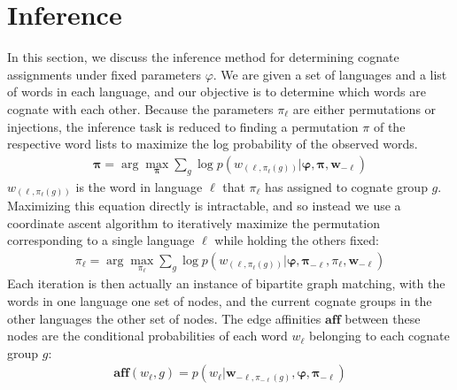 \documentclass[11pt,a4paper]{article}
\begin{document}
\section{Inference}
In this section, we discuss the inference method for determining
cognate assignments under fixed parameters $\varphi$.  We are given a
set of languages and a list of words in each language, and our
objective is to determine which words are cognate with each other.
Because the parameters $\pi_\ell$ are either permutations or injections,
the inference task is reduced to finding a permutation $\pi$ of the
respective word lists to maximize the log probability of the observed
words.
\begin{equation*}
  \begin{split}
    \mathbf{\pi} = \arg\!\max_{\mathbf \pi} \sum_{g} \log p(w_{(\ell,\pi_\ell(g))}|\mathbf \varphi,\mathbf \pi, \mathbf{w}_{-\ell})
   \end{split}
 \end{equation*}
$w_{(\ell,\pi_\ell(g))}$ is the word in language $\ell$ that
$\pi_\ell$ has assigned to cognate group $g$. Maximizing this equation
directly is intractable, and so instead we use a coordinate ascent
algorithm to iteratively maximize the permutation corresponding to
a single language $\ell$ while holding the others fixed:
\begin{equation*}
  \begin{split}
    \pi_\ell = \arg\!\max_{\pi_\ell} \sum_{g} \log p(w_{(\ell,\pi_\ell(g))}|\mathbf \varphi,\mathbf \pi_{-\ell},\pi_\ell, \mathbf{w}_{-\ell})
  \end{split}
\end{equation*}
Each iteration is then actually an instance of bipartite graph
matching, with the words in one language one set of nodes, and the
current cognate groups in the other languages the other set of
nodes. The edge affinities $\mathbf{aff}$ between these nodes are the conditional
probabilities of each word $w_\ell$ belonging to each cognate group $g$:
\begin{equation*}
  \begin{split}
    \mathbf{aff}(w_\ell,g) = p(w_\ell|\mathbf w_{-\ell,\pi_{-\ell}(g)},\mathbf \varphi,\mathbf\pi_{-\ell})
   \end{split}
 \end{equation*}
\end{document}
